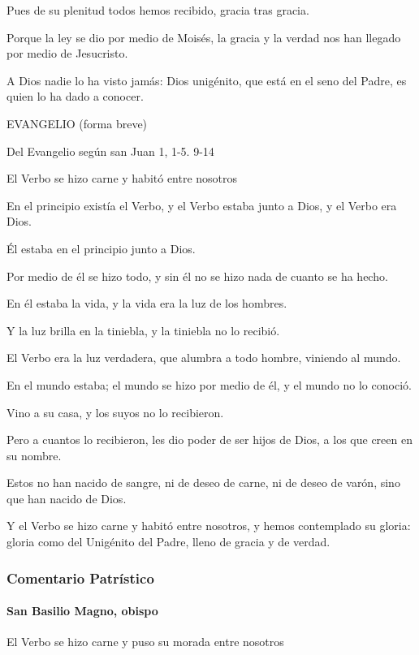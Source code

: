 \documentclass[]{article}
\let\oldparagraph\paragraph
\renewcommand{\paragraph}[1]{\oldparagraph{#1}\mbox{}}
\begin{document}
Pues de su plenitud todos hemos recibido, gracia tras gracia.

Porque la ley se dio por medio de Moisés, la gracia y la verdad nos han
llegado por medio de Jesucristo.

A Dios nadie lo ha visto jamás: Dios unigénito, que está en el seno del
Padre, es quien lo ha dado a conocer.

EVANGELIO (forma breve)

Del Evangelio según san Juan 1, 1-5. 9-14

El Verbo se hizo carne y habitó entre nosotros

En el principio existía el Verbo, y el Verbo estaba junto a Dios, y el
Verbo era Dios.

Él estaba en el principio junto a Dios.

Por medio de él se hizo todo, y sin él no se hizo nada de cuanto se ha
hecho.

En él estaba la vida, y la vida era la luz de los hombres.

Y la luz brilla en la tiniebla, y la tiniebla no lo recibió.

El Verbo era la luz verdadera, que alumbra a todo hombre, viniendo al
mundo.

En el mundo estaba; el mundo se hizo por medio de él, y el mundo no lo
conoció.

Vino a su casa, y los suyos no lo recibieron.

Pero a cuantos lo recibieron, les dio poder de ser hijos de Dios, a los
que creen en su nombre.

Estos no han nacido de sangre, ni de deseo de carne, ni de deseo de
varón, sino que han nacido de Dios.

Y el Verbo se hizo carne y habitó entre nosotros, y hemos contemplado su
gloria: gloria como del Unigénito del Padre, lleno de gracia y de
verdad.

\protect\hypertarget{_Toc448662800}{}{}

\subsubsection{Comentario Patrístico}\label{comentario-patruxedstico-7}

\paragraph{San Basilio Magno, obispo}\label{san-basilio-magno-obispo}

El Verbo se hizo carne y puso su morada entre nosotros
\end{document}
